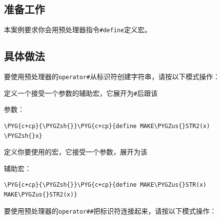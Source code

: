 
\subsection{准备工作}



本案例要求你会用预处理器指令\texttt{\#define}定义宏。



\subsection{具体做法}



要使用预处理器的\texttt{operator\#}从标识符创建字符串，请按以下模式操作：



定义一个接受一个参数的辅助宏，它展开为\texttt{\#}后跟该



参数：



\begin{codeblockbg}
\begin{Verbatim}[commandchars=\\\{\},breaklines=true,breakanywhere=true,fontsize=\codefont,xleftmargin=17bp]
\PYG{c+cp}{\PYGZsh{}}\PYG{c+cp}{define MAKE\PYGZus{}STR2(x) \PYGZsh{}x}
\end{Verbatim}
\end{codeblockbg}



定义你要使用的宏，它接受一个参数，展开为该



辅助宏：



\begin{codeblockbg}
\begin{Verbatim}[commandchars=\\\{\},breaklines=true,breakanywhere=true,fontsize=\codefont,xleftmargin=17bp]
\PYG{c+cp}{\PYGZsh{}}\PYG{c+cp}{define MAKE\PYGZus{}STR(x) MAKE\PYGZus{}STR2(x)}
\end{Verbatim}
\end{codeblockbg}



要使用预处理器的\texttt{operator\#\#}把标识符连接起来，请按以下模式操作：


